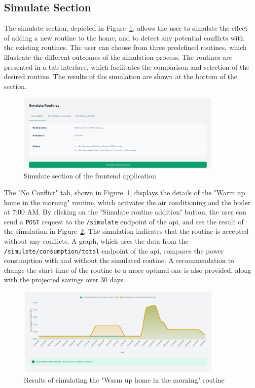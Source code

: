 \subsection{Simulate Section}

The simulate section, depicted in Figure~\ref{fig:frontend_simulate}, allows the user to simulate the effect of adding a new routine to the home, and to detect any potential conflicts with the existing routines. The user can choose from three predefined routines, which illustrate the different outcomes of the simulation process. The routines are presented in a tab interface, which facilitates the comparison and selection of the desired routine. The results of the simulation are shown at the bottom of the section.

\begin{figure}
    \centering
    \includegraphics[width=0.9\textwidth]{images/frontend/simulate.png}
    \caption{Simulate section of the frontend application}
    \label{fig:frontend_simulate}
\end{figure}

The "No Conflict" tab, shown in Figure~\ref{fig:frontend_simulate}, displays the details of the "Warm up home in the morning" routine, which activates the air conditioning and the boiler at 7:00 AM. By clicking on the "Simulate routine addition" button, the user can send a \texttt{POST} request to the \texttt{/simulate} endpoint of the \acrshort{api}, and see the result of the simulation in Figure~\ref{fig:frontend_no_conflict_result}. The simulation indicates that the routine is accepted without any conflicts. A graph, which uses the data from the \texttt{/simulate/consumption/total} endpoint of the \acrshort{api}, compares the power consumption with and without the simulated routine. A recommendation to change the start time of the routine to a more optimal one is also provided, along with the projected savings over 30 days.

\begin{figure}
    \centering
    \includegraphics[width=0.9\textwidth]{images/frontend/no_conflict_result.png}
    \caption{Results of simulating the "Warm up home in the morning" routine}
    \label{fig:frontend_no_conflict_result}
\end{figure}

